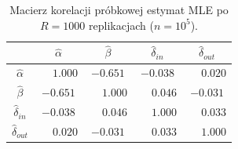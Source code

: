 \begin{table}[htbp]
    \centering
    \caption{Macierz korelacji pr\'obkowej estymat MLE po $R=1000$ replikacjach ($n=10^5$).}
    \label{tab:expC-corr}
    \begin{tabular}{c|cccc}
        \toprule
         & $\hat\alpha$ & $\hat\beta$ & $\hat\delta_{in}$ & $\hat\delta_{out}$ \\
        \midrule
        $\hat\alpha$ & $\phantom{-}1.000$ & $-0.651$ & $-0.038$ & $\phantom{-}0.020$ \\
        $\hat\beta$ & $-0.651$ & $\phantom{-}1.000$ & $\phantom{-}0.046$ & $-0.031$ \\
        $\hat\delta_{in}$ & $-0.038$ & $\phantom{-}0.046$ & $\phantom{-}1.000$ & $\phantom{-}0.033$ \\
        $\hat\delta_{out}$ & $\phantom{-}0.020$ & $-0.031$ & $\phantom{-}0.033$ & $\phantom{-}1.000$ \\
        \bottomrule
    \end{tabular}
\end{table}
